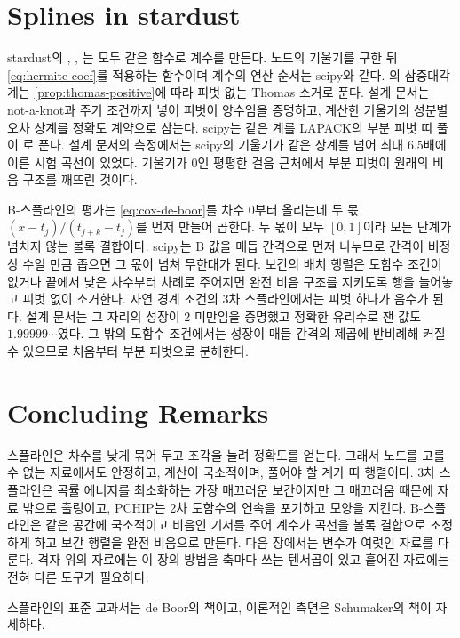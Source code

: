 \section{Splines in stardust}
\label{sec:spline-stardust}

\begin{instardust}
stardust의 , , 는 모두 같은 함수로 계수를 만든다. 노드의 기울기를 구한 뒤 \eqref{eq:hermite-coef}를 적용하는 함수이며 계수의 연산 순서는 scipy와 같다. 의 삼중대각 계는 \cref{prop:thomas-positive}에 따라 피벗 없는 Thomas 소거로 푼다. 설계 문서는 not-a-knot과 주기 조건까지 넣어 피벗이 양수임을 증명하고, 계산한 기울기의 성분별 오차 상계를 정확도 계약으로 삼는다. scipy는 같은 계를 LAPACK의 부분 피벗 띠 풀이 로 푼다. 설계 문서의 측정에서는 scipy의 기울기가 같은 상계를 넘어 최대 $6.5$배에 이른 시험 곡선이 있었다. 기울기가 $0$인 평평한 걸음 근처에서 부분 피벗이 원래의 비음 구조를 깨뜨린 것이다.
\end{instardust}

\begin{instardust}
B-스플라인의 평가는 \eqref{eq:cox-de-boor}를 차수 $0$부터 올리는데 두 몫 $(x-t_j)/(t_{j+k}-t_j)$를 먼저 만들어 곱한다. 두 몫이 모두 $[0,1]$이라 모든 단계가 넘치지 않는 볼록 결합이다. scipy는 B 값을 매듭 간격으로 먼저 나누므로 간격이 비정상 수일 만큼 좁으면 그 몫이 넘쳐 무한대가 된다. 보간의 배치 행렬은 도함수 조건이 없거나 끝에서 낮은 차수부터 차례로 주어지면 완전 비음 구조를 지키도록 행을 늘어놓고 피벗 없이 소거한다. 자연 경계 조건의 3차 스플라인에서는 피벗 하나가 음수가 된다. 설계 문서는 그 자리의 성장이 $2$ 미만임을 증명했고 정확한 유리수로 잰 값도 $1.99999\cdots$였다. 그 밖의 도함수 조건에서는 성장이 매듭 간격의 제곱에 반비례해 커질 수 있으므로 처음부터 부분 피벗으로 분해한다.
\end{instardust}

\section{Concluding Remarks}

스플라인은 차수를 낮게 묶어 두고 조각을 늘려 정확도를 얻는다. 그래서 노드를 고를 수 없는 자료에서도 안정하고, 계산이 국소적이며, 풀어야 할 계가 띠 행렬이다. 3차 스플라인은 곡률 에너지를 최소화하는 가장 매끄러운 보간이지만 그 매끄러움 때문에 자료 밖으로 출렁이고, PCHIP는 2차 도함수의 연속을 포기하고 모양을 지킨다. B-스플라인은 같은 공간에 국소적이고 비음인 기저를 주어 계수가 곡선을 볼록 결합으로 조정하게 하고 보간 행렬을 완전 비음으로 만든다. 다음 장에서는 변수가 여럿인 자료를 다룬다. 격자 위의 자료에는 이 장의 방법을 축마다 쓰는 텐서곱이 있고 흩어진 자료에는 전혀 다른 도구가 필요하다.

스플라인의 표준 교과서는 de Boor의 책\cite{deboor2001guide}이고, 이론적인 측면은 Schumaker의 책\cite{schumaker2007}이 자세하다.

\chapterreferences
